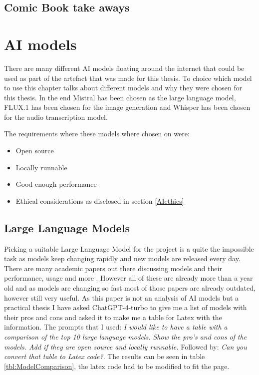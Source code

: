 \subsection{Comic Book take aways}

\section{AI models}
There are many different AI models floating around the internet that could be used as part of the artefact that was made for this thesis. To choice which model to use this chapter talks about different models and why they were chosen for this thesis. In the end Mistral has been chosen as the large language model, FLUX.1 has been chosen for the image generation and Whisper has been chosen for the audio transcription model.

The requirements where these models where chosen on were:
\begin{itemize}
	\item Open source
	\item Locally runnable
	\item Good enough performance
	\item Ethical considerations as disclosed in section \ref{AIethics}
\end{itemize}
\subsection{Large Language Models}

Picking a suitable Large Language Model for the project is a quite the impossible task as models keep changing rapidly and new models are released every day. There are many academic papers out there discussing models and their performance, usage and more \cite{2024arXiv240201687A,chang2024survey,hadi2023survey,zhao2023survey}. However all of these are already more than a year old and as models are changing so fast most of those papers are already outdated, however still very useful. As this paper is not an analysis of AI models but a practical thesis I have asked ChatGPT-4-turbo to give me a list of models with their pros and cons and asked it to make me a table for Latex with the information. The prompts that I used: \textit{I would like to have a table with a comparison of the top 10 large language models. Show the pro's and cons of the models. Add if they are open source and locally runnable.} Followed by: \textit{Can you convert that table to Latex code?}. The results can be seen in table \ref{tbl:ModelComparison}, the latex code had to be modified to fit the page.

